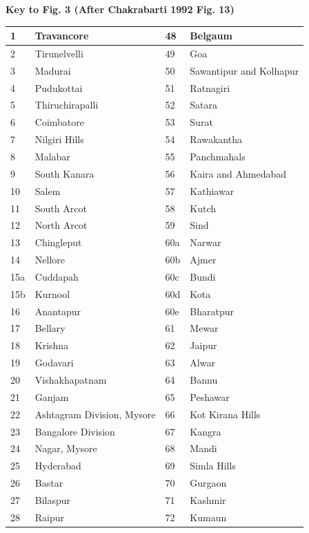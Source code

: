 \begin{center}
\textbf{Key to Fig. 3 (After Chakrabarti 1992 Fig. 13)}
\end{center}

\begin{longtable}{|l|p{3.3cm}|l|p{3.3cm}|}
\hline
1 & Travancore & 48 & Belgaum \\
\hline
2 & Tirunelvelli & 49 & Goa \\
\hline
3 & Madurai & 50 & Sawantipur and Kolhapur \\
\hline
4 & Pudukottai & 51 & Ratnagiri \\
\hline
5 & Thiruchirapalli & 52 & Satara \\
\hline
6 & Coimbatore & 53 & Surat \\
\hline
7 & Nilgiri Hills & 54 & Rawakantha \\
\hline
8 & Malabar & 55 & Panchmahals \\
\hline
9 & South Kanara & 56 & Kaira and Ahmedabad \\
\hline
10 & Salem & 57 & Kathiawar \\
\hline
11 & South Arcot & 58 & Kutch \\
\hline
12 & North Arcot & 59 & Sind \\
\hline
13 & Chingleput & 60a & Narwar \\
\hline
14 & Nellore & 60b & Ajmer \\
\hline
15a & Cuddapah & 60c & Bundi \\
\hline
15b & Kurnool & 60d & Kota \\
\hline
16 & Anantapur & 60e & Bharatpur \\
\hline
17 & Bellary & 61 & Mewar \\
\hline
18 & Krishna & 62 & Jaipur \\
\hline
19 & Godavari & 63 & Alwar \\
\hline
20 & Vishakhapatnam & 64 & Bannu \\
\hline
21 & Ganjam & 65 & Peshawar \\
\hline
22 & Ashtagram Division, Mysore & 66 & Kot Kirana Hills \\
\hline
23 & Bangalore Division & 67 & Kangra \\
\hline
24 & Nagar, Mysore & 68 & Mandi \\
\hline
25 & Hyderabad & 69 & Simla Hills \\
\hline
26 & Bastar & 70 & Gurgaon \\
\hline
27 & Bilaspur & 71 & Kashmir \\
\hline
28 & Raipur & 72 & Kumaun \\

\end{longtable}
